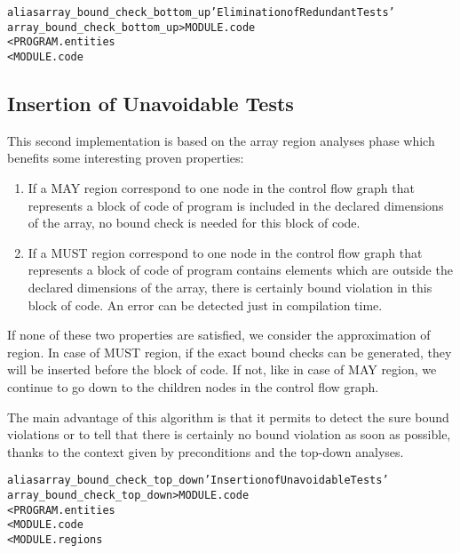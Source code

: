 \documentclass[a4paper]{report}
\newenvironment{PipsMake}{\begin{alltt}}{\end{alltt}}
\newenvironment{PipsPass}[1]{\label{pass:#1}}{}
\begin{document}
\begin{PipsMake}
alias array_bound_check_bottom_up 'Elimination of Redundant Tests'
array_bound_check_bottom_up            > MODULE.code
        < PROGRAM.entities
        < MODULE.code
\end{PipsMake}


\subsection{Insertion of Unavoidable Tests}
\label{subsection-array-bound-check_top_down}

\begin{PipsPass}{array_bound_check_top_down}
This second implementation is based on the array region analyses phase which benefits some interesting proven properties:

\begin{enumerate}

\item If a MAY region correspond to one node in the control flow graph
  that represents a block of code of program is included in the
  declared dimensions of the array, no bound check is needed for this
  block of code.

\item If a MUST region correspond to one node in the control
  flow graph that represents a block of code of program contains elements
  which are outside the declared dimensions of the  array, there is
  certainly bound violation in this block of code. An error can be
  detected just in compilation time.

\end{enumerate}

If none of these two properties are satisfied, we consider the
approximation of region. In case of MUST region, if the exact bound checks
can be generated, they will be inserted before the block of code. If not,
like in case of MAY region, we continue to go down to the children nodes
in the control flow graph.

 The main advantage
of this algorithm is that it permits to detect the sure bound violations
or to tell that there is certainly no bound violation as soon as
possible, thanks to the context given by preconditions and the top-down
analyses.
\end{PipsPass}

\begin{PipsMake}
alias array_bound_check_top_down 'Insertion of Unavoidable Tests'
array_bound_check_top_down   > MODULE.code
        < PROGRAM.entities
        < MODULE.code
        < MODULE.regions
\end{PipsMake}
\end{document}
